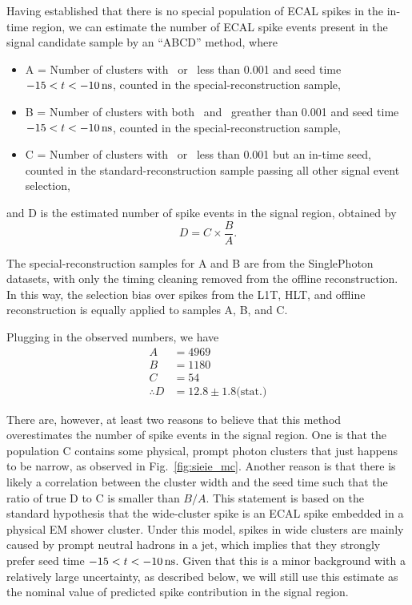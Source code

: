 Having established that there is no special population of ECAL spikes in the in-time region, we can estimate the number of ECAL spike events present in the signal candidate sample by an ``ABCD'' method, where
\begin{itemize}
  \item A = Number of clusters with \sieie\ or \sipip\ less than 0.001 and seed time $-15 < t < -10\, \text{ns}$, counted in the special-reconstruction sample,
  \item B = Number of clusters with both \sieie\ and \sipip\ greather than 0.001 and seed time $-15 < t < -10\, \text{ns}$, counted in the special-reconstruction sample, 
  \item C = Number of clusters with \sieie\ or \sipip\ less than 0.001 but an in-time seed, counted in the standard-reconstruction sample passing all other signal event selection, 
\end{itemize}
and D is the estimated number of spike events in the signal region, obtained by
\begin{equation}
  D = C \times \frac{B}{A}.
\end{equation}

The special-reconstruction samples for A and B are from the SinglePhoton datasets, with only the timing cleaning removed from the offline reconstruction.
In this way, the selection bias over spikes from the L1T, HLT, and offline reconstruction is equally applied to samples A, B, and C.

Plugging in the observed numbers, we have
\begin{align*}
  A &= 4969 \\
  B &= 1180 \\
  C &= 54 \\
  \therefore D &= 12.8 \pm 1.8 \text{(stat.)}
\end{align*}

There are, however, at least two reasons to believe that this method overestimates the number of spike events in the signal region. 
One is that the population C contains some physical, prompt photon clusters that just happens to be narrow, as observed in Fig.~\ref{fig:sieie_mc}. 
Another reason is that there is likely a correlation between the cluster width and the seed time such that the ratio of true D to C is smaller than $B/A$.
This statement is based on the standard hypothesis that the wide-cluster spike is an ECAL spike embedded in a physical EM shower cluster. 
Under this model, spikes in wide clusters are mainly caused by prompt neutral hadrons in a jet, which implies that they strongly prefer seed time $-15 < t < -10\, \text{ns}$. 
Given that this is a minor background with a relatively large uncertainty, as described below, we will still use this estimate as the nominal value of predicted spike contribution in the signal region.


